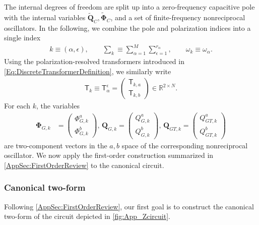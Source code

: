 \documentclass[prx,aps,twocolumn,article]{revtex4-2}
\newcommand{\msf}[1]{\mathsf{#1}}
\newcommand{\bsb}[1]{\boldsymbol{#1}}
\newcommand{\bPhi}{\bsb{\Phi}}
\newcommand{\bQ}{\bsb{Q}}
\newcommand{\msT}{\msf{T}}
\begin{document}
The internal degrees of freedom are split up into a zero-frequency capacitive pole with the internal variables $\tilde{\bQ}_C,\tilde{\bPhi}_C$, and a set of finite-frequency nonreciprocal oscillators. In the following, we combine the pole and polarization indices into a single index
\begin{align}
    k
    \equiv
    (\alpha,\epsilon),
    \qquad
    \sum_k
    \equiv
    \sum_{\alpha=1}^{M}
    \sum_{\epsilon=1}^{r_\alpha},
    \qquad
    \omega_k
    \equiv
    \omega_\alpha.
\end{align}
Using the polarization-resolved transformers introduced in
\cref{Eq:DiscreteTransformerDefinition}, we similarly write
\begin{align}
    \msT_k
    \equiv
    \msT_\alpha^\epsilon
    =
    \begin{pmatrix}
        \msT_{k,a}\\
        \msT_{k,b}
    \end{pmatrix}
    \in
    \mathbb{R}^{2\times N}.
\end{align}
For each $k$, the variables
\begin{align}
    \bPhi_{G,k}
    &=
    \begin{pmatrix}
        \Phi_{G,k}^{a}\\
        \Phi_{G,k}^{b}
    \end{pmatrix},
    \,
    \bQ_{G,k}
    =
    \begin{pmatrix}
        Q_{G,k}^{a}\\
        Q_{G,k}^{b}
    \end{pmatrix},
    \,
    \bQ_{GT,k}
    =
    \begin{pmatrix}
        Q_{GT,k}^{a}\\
        Q_{GT,k}^{b}
    \end{pmatrix}\nonumber
\end{align}
are two-component vectors in the $a,b$ space of the corresponding
nonreciprocal oscillator. We now apply the first-order construction summarized in 
\cref{AppSec:FirstOrderReview} to the canonical circuit.


\subsubsection{Canonical two-form}
\label{Sec:TwoForm}

Following \cref{AppSec:FirstOrderReview}, our first goal is to  construct the canonical two-form of the circuit depicted in \cref{fig:App_Zcircuit}. 
\end{document}
